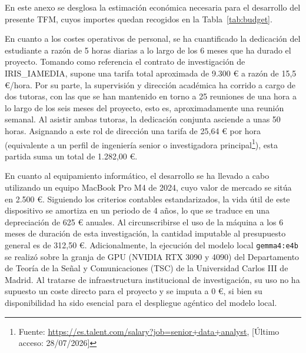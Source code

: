 
En este anexo se desglosa la estimación económica necesaria para el desarrollo del presente TFM, cuyos importes quedan recogidos en la Tabla~\ref{tab:budget}.


En cuanto a los costes operativos de personal, se ha cuantificado la dedicación del estudiante a razón de 5 horas diarias a lo largo de los 6 meses que ha durado el proyecto. Tomando como referencia el contrato de investigación de IRIS\_IAMEDIA, supone una tarifa total aproximada de 9.300 € a razón de 15,5 €/hora. Por su parte, la supervisión y dirección académica ha corrido a cargo de dos tutoras, con las que se han mantenido en torno a 25 reuniones de una hora a lo largo de los seis meses del proyecto, esto es, aproximadamente una reunión semanal. Al asistir ambas tutoras, la dedicación conjunta asciende a unas 50 horas. Asignando a este rol de dirección una tarifa de 25,64 € por hora (equivalente a un perfil de ingeniería senior o investigadora principal\footnote{Fuente: \url{https://es.talent.com/salary?job=senior+data+analyst}, [Último acceso: 28/07/2026]}), esta partida suma un total de 1.282,00 €.


En cuanto al equipamiento informático, el desarrollo se ha llevado a cabo utilizando un equipo MacBook Pro M4 de 2024, cuyo valor de mercado se sitúa en 2.500 €. Siguiendo los criterios contables estandarizados, la vida útil de este dispositivo se amortiza en un periodo de 4 años, lo que se traduce en una depreciación de 625 € anuales. Al circunscribirse el uso de la máquina a los 6 meses de duración de esta investigación, la cantidad imputable al presupuesto general es de 312,50 €. Adicionalmente, la ejecución del modelo local \texttt{gemma4:e4b} se realizó sobre la granja de GPU (NVIDIA RTX 3090 y 4090) del Departamento de Teoría de la Señal y Comunicaciones (TSC) de la Universidad Carlos III de Madrid. Al tratarse de infraestructura institucional de investigación, su uso no ha supuesto un coste directo para el proyecto y se imputa a 0 €, si bien su disponibilidad ha sido esencial para el despliegue agéntico del modelo local.

